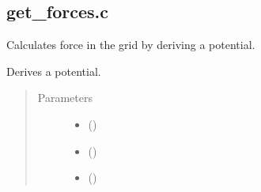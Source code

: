 \documentclass[letterpaper,10pt,english]{sphinxmanual}
\begin{document}

\begin{fulllineitems}
\label{\detokenize{sphinx-c-apidoc/output/gravity/restrict_c:c.restrict_grid_original}}%
\pysigstartmultiline
{}%
\pysigstopmultiline
\end{fulllineitems}



\subsection{get\_forces.c}
\label{\detokenize{sphinx-c-apidoc/output/gravity/get_forces_c:get-forces-c}}\label{\detokenize{sphinx-c-apidoc/output/gravity/get_forces_c::doc}}
Calculates force in the grid by deriving a potential.

\begin{fulllineitems}
\label{\detokenize{sphinx-c-apidoc/output/gravity/get_forces_c:c.forces}}%
\pysigstartmultiline
{}%
\pysigstopmultiline
Derives a potential.
\begin{quote}\begin{description}
\item[{Parameters}] \leavevmode\begin{itemize}
\item {} 
 (\sphinxstyleliteralemphasis{\sphinxupquote{\sphinxhyphen{}}}) \textendash{} 

\item {} 
 (\sphinxstyleliteralemphasis{\sphinxupquote{\sphinxhyphen{}}}) \textendash{} 

\item {} 
 (\sphinxstyleliteralemphasis{\sphinxupquote{\sphinxhyphen{}}}) \textendash{} 

\end{itemize}

\end{description}\end{quote}

\end{fulllineitems}
\end{document}
